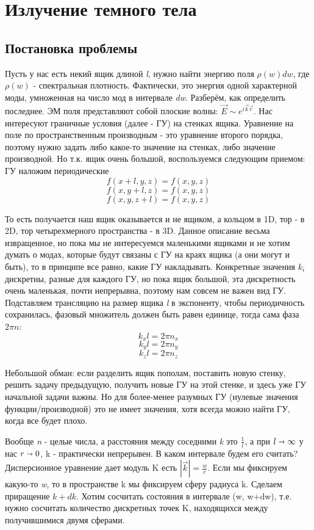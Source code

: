 \newpage
\chapter{Излучение темного тела}
\section{Постановка проблемы}

\par Пусть у нас есть некий ящик длиной \textit{l}, нужно найти энергию поля $\rho (w) dw$, где $\rho(w)$ - спектральная плотность. Фактически, это энергия одной характерной моды, умноженная на число мод в интервале \textit{dw}. Разберём, как определить последнее. ЭМ поля представляют собой плоские волны: $\vec{E} \sim e^{i \vec{k} \vec{r}}$. Нас интересуют граничные условия (далее - ГУ) на стенках ящика. Уравнение на поле по пространственным производным - это уравнение второго порядка, поэтому нужно задать либо какое-то значение на стенках, либо значение производной. Но т.к. ящик очень большой, воспользуемся следующим приемом: ГУ наложим периодические
$$f(x+l,y,z)=f(x,y,z) $$
$$f(x,y+l,z)=f(x,y,z) $$
$$f(x,y,z+l)=f(x,y,z) $$
\par То есть получается наш ящик оказывается и не ящиком, а кольцом в 1D, тор - в 2D, тор четырехмерного пространства - в 3D. Данное описание весьма извращенное, но пока мы не интересуемся маленькими ящиками и не хотим думать о модах, которые будут связаны с ГУ на краях ящика (а они могут и быть), то в принципе все равно, какие ГУ накладывать. Конкретные значения $k_i$ дискретны, разные для каждого ГУ, но пока ящик большой, эта дискретность очень маленькая, почти непрерывна, поэтому нам совсем не важен вид ГУ. Подставляем трансляцию на размер ящика \textit{l} в экспоненту, чтобы периодичность сохранилась, фазовый множитель должен быть равен единице, тогда сама фаза $ 2 \pi n$:
$$ k_x l=2 \pi n_x$$
$$ k_y l=2 \pi n_y$$
$$ k_z l=2 \pi n_z$$
\par Небольшой обман: если разделить ящик пополам, поставить новую стенку, решить задачу предыдущую, получить новые ГУ на этой стенке, и здесь уже ГУ начальной задачи важны. Но для более-менее разумных ГУ (нулевые значения функции/производной) это не имеет значения, хотя всегда можно найти ГУ, когда все будет плохо.
\par Вообще \textit{n} - целые числа, а расстояния между соседними \textit{k} это $\frac{1}{l}$, а при $l \shortrightarrow \infty$ у нас $r \shortrightarrow 0$, k - практически непрерывен. В каком интервале  будем его считать? Дисперсионное уравнение дает модуль K есть $|\vec{k}|=\frac{w}{c}$. Если мы фиксируем какую-то \textit{w}, то в пространстве k мы фиксируем сферу радиуса k. Сделаем приращение $ k+d k$. Хотим сосчитать состояния в интервале (w, w+dw), т.е. нужно сосчитать количество дискретных точек K, находящихся между получившимися двумя сферами. 


